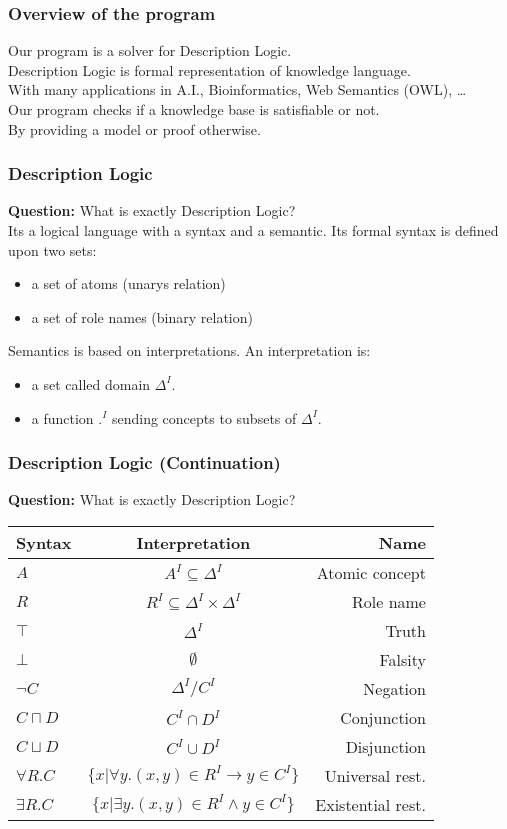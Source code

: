 \begin{frame}
  \frametitle{Overview of the program}
  Our program is a solver for Description Logic. \\
  \pause
  \smallskip
  Description Logic is formal representation of knowledge language. \\
  With many applications in A.I., Bioinformatics, Web Semantics (OWL), \dots \\
  \pause
  \bigskip
  Our program checks if a knowledge base is satisfiable or not. \\
  By providing a model or proof otherwise. \\
\end{frame}

\begin{frame}
\frametitle{Description Logic}
{\bf Question:} What is exactly Description Logic? \\
\pause
\smallskip
Its a logical language with a syntax and a semantic.
\pause \smallskip
Its formal syntax is defined upon two sets:  \\
\begin{itemize}
\item a set of atoms (unarys relation)
\item a set of role names (binary relation)
\end{itemize}
\pause \smallskip
Semantics is based on interpretations. An interpretation is: \\
\begin{itemize}
\item a set called domain $\Delta^{I}$.
\item a function $.^{I}$ sending concepts to subsets of $\Delta^{I}$.
\end{itemize}
\end{frame}

\begin{frame}
\frametitle{Description Logic (Continuation)}
{\bf Question:} What is exactly Description Logic? \\
\pause
\bigskip
\begin{tabular}{|l|c|r|}
\hline
{\bf Syntax } & {\bf Interpretation } & {\bf Name } \\ \hline
$A$ & $A^{I} \subseteq \Delta^{I}$ & Atomic concept \\ 
$R$ & $R^{I} \subseteq \Delta^{I} \times \Delta^{I}$ & Role name \\
$\top$ & $\Delta^{I}$ & Truth \\
$\bot$ & $\emptyset$ & Falsity \\
$\neg C$ & $\Delta^{I} / C^{I}$ & Negation \\
$C \sqcap D$ & $C^{I} \cap D^{I}$ & Conjunction \\
$C \sqcup D$ & $C^{I} \cup D^{I}$ & Disjunction \\
$\forall R . C$ & $\{x | \forall y . (x,y) \in R^{I} \to y \in C^{I}\}$ & Universal rest. \\
$\exists R . C$ & $\{x | \exists y . (x,y) \in R^{I} \land y \in C^{I}\}$ & Existential rest. \\
\hline 
\end{tabular}
\end{frame}

